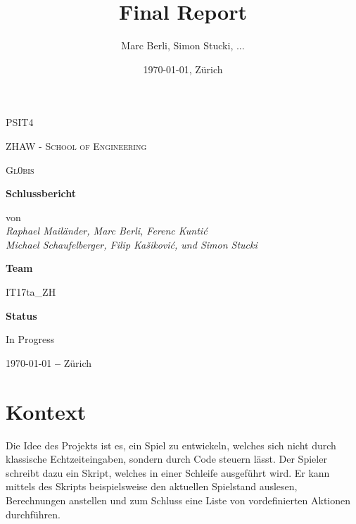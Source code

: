 \documentclass[a4paper, 11pt]{scrartcl}
\title{Final Report}
\author{Marc Berli, Simon Stucki, ...}
\date{\today{}, Zürich}
\let\oldsection\section
\renewcommand\section{\clearpage\oldsection}
\begin{document}
\begin{titlepage}
\centering
{\scshape\LARGE PSIT4 \par}
\vspace{1cm}
{\scshape ZHAW - School of Engineering\par}
\vspace{1cm}
{\scshape\Large Gl0bis\par}
\vspace{1.5cm}
{\huge\bfseries Schlussbericht\par}
\vspace{2cm}
von
\vspace{1em}
\Large\itshape \\ Raphael Mailänder, Marc Berli, Ferenc Kuntić \\ Michael Schaufelberger, Filip Kašiković, und Simon Stucki\par
\vfill
\textbf{Team}\par
IT17ta\_ZH\par
\vspace{2em}
\textbf{Status}\par
In Progress

\vfill

{\large \today \textbf{ --} Zürich\par}
\end{titlepage}

\tableofcontents

\newpage

\section{Kontext}

Die Idee des Projekts ist es, ein Spiel zu entwickeln,
welches sich nicht durch klassische Echtzeiteingaben,
sondern durch Code steuern lässt.
Der Spieler schreibt dazu ein Skript,
welches in einer Schleife ausgeführt wird.
Er kann mittels des Skripts beispielsweise den aktuellen Spielstand auslesen,
Berechnungen anstellen und zum Schluss eine Liste von vordefinierten Aktionen durchführen.
\end{document}
